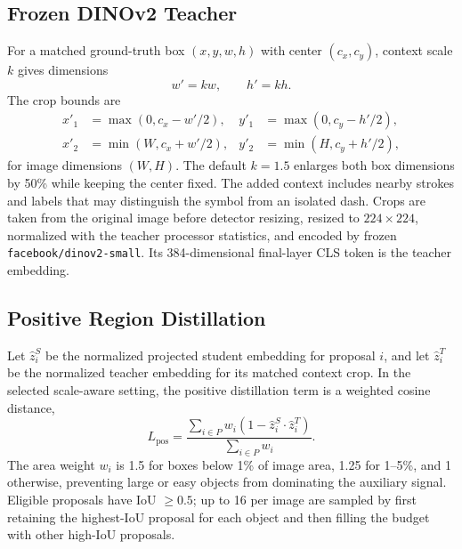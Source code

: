 \documentclass[conference,a4paper]{IEEEtran}
\begin{document}
\subsection{Frozen DINOv2 Teacher}
For a matched ground-truth box $(x,y,w,h)$ with center $(c_x,c_y)$, context scale $k$ gives dimensions
\begin{equation}
w'=kw, \qquad h'=kh.
\end{equation}
The crop bounds are
\begin{equation}
\begin{aligned}
x'_1&=\max(0,c_x-w'/2), & y'_1&=\max(0,c_y-h'/2),\\
x'_2&=\min(W,c_x+w'/2), & y'_2&=\min(H,c_y+h'/2),
\end{aligned}
\end{equation}
for image dimensions $(W,H)$. The default $k=1.5$ enlarges both box dimensions by 50\% while keeping the center fixed. The added context includes nearby strokes and labels that may distinguish the symbol from an isolated dash. Crops are taken from the original image before detector resizing, resized to $224\times224$, normalized with the teacher processor statistics, and encoded by frozen \texttt{facebook/dinov2-small}. Its 384-dimensional final-layer CLS token is the teacher embedding.

\subsection{Positive Region Distillation}
Let $\hat{z}^{S}_{i}$ be the normalized projected student embedding for proposal $i$, and let $\hat{z}^{T}_{i}$ be the normalized teacher embedding for its matched context crop. In the selected scale-aware setting, the positive distillation term is a weighted cosine distance,
\begin{equation}
L_{\mathrm{pos}} =
\frac{\sum_{i \in P} w_i \left(1 - \hat{z}^{S}_{i} \cdot \hat{z}^{T}_{i}\right)}
{\sum_{i \in P} w_i}.
\end{equation}
The area weight $w_i$ is 1.5 for boxes below 1\% of image area, 1.25 for 1--5\%, and 1 otherwise, preventing large or easy objects from dominating the auxiliary signal. Eligible proposals have IoU $\geq0.5$; up to 16 per image are sampled by first retaining the highest-IoU proposal for each object and then filling the budget with other high-IoU proposals.
\end{document}

